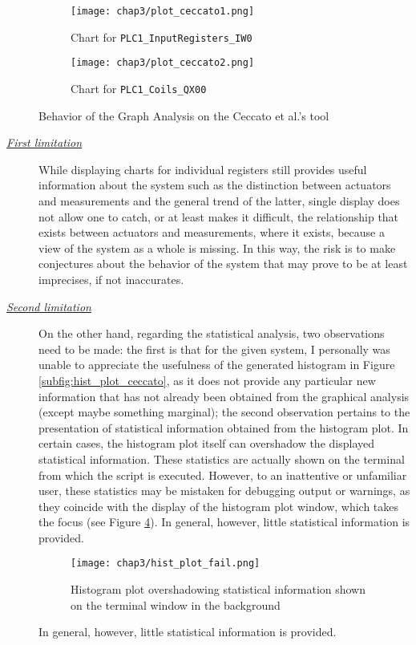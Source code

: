 \begin{figure}[ht]
	\centering
	\begin{subfigure}{0.48\textwidth}
		\texttt{[image: chap3/plot\_ceccato1.png]}
		\caption{Chart for \texttt{PLC1\_InputRegisters\_IW0}}
		\label{subfig:3_real_plot_ceccato_1}
	\end{subfigure}
	\hfill
	\begin{subfigure}{0.48\textwidth}
		\texttt{[image: chap3/plot\_ceccato2.png]}
		\caption{Chart for \texttt{PLC1\_Coils\_QX00}}
		\label{subfig:3_real_plot_ceccato_2}
	\end{subfigure}
	\caption{Behavior of the Graph Analysis on the Ceccato et al.'s tool}
	\label{fig:3_ceccato_graphs_behavior}
\end{figure}

\begin{description}
	\item[\emph{\underline{First limitation}}] While displaying charts for individual registers still provides useful information about the system such as the distinction between actuators and measurements and the general trend of the latter, single display does not allow one to catch, or at least makes it difficult, the relationship that exists between actuators and measurements, where it exists, because a view of the system as a whole is missing.\newline
	In this way, the risk is to make conjectures about the behavior of the system that may prove to be at least imprecises, if not inaccurates.

	\item[\emph{\underline{Second limitation}}] On the other hand, regarding the statistical analysis, two observations need to be made: the first is that for the given system, I personally was unable to appreciate the usefulness of the generated histogram in Figure \ref{subfig:hist_plot_ceccato}, as it does not provide any particular new information that has not already been obtained from the graphical analysis (except maybe something marginal); the second observation pertains to the presentation of statistical information obtained from the histogram plot. In certain cases, the histogram plot itself can overshadow the displayed statistical information. These statistics are actually shown on the terminal from which the script is executed. However, to an inattentive or unfamiliar user, these statistics may be mistaken for debugging output or warnings, as they coincide with the display of the histogram plot window, which takes the focus (see Figure \ref{fig:3_hist_plot_fail}).\newline
	In general, however, little statistical information is provided.

\begin{figure}[ht]
	\centering
	\texttt{[image: chap3/hist\_plot\_fail.png]}
	\caption{Histogram plot overshadowing statistical information shown on the terminal window in the background}
	\label{fig:3_hist_plot_fail}
\end{figure}
In general, however, little statistical information is provided.
\end{description}

